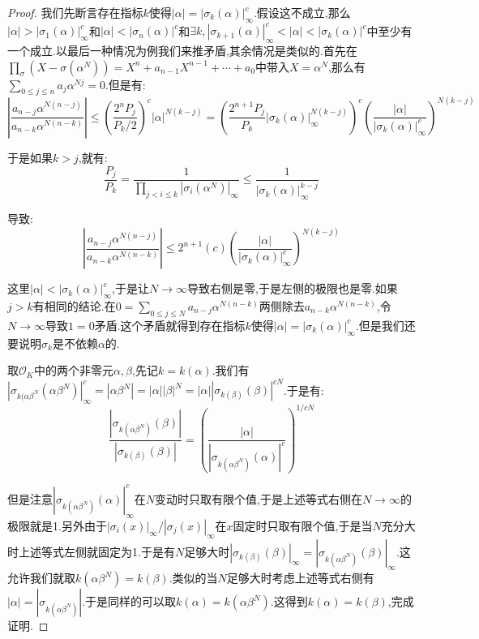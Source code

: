 \begin{enumerate}
\begin{proof}
		\qquad
		
		我们先断言存在指标$k$使得$|\alpha|=|\sigma_k(\alpha)|_{\infty}^c$.假设这不成立,那么$|\alpha|>|\sigma_1(\alpha)|_{\infty}^c$和$|\alpha|<|\sigma_n(\alpha)|^c$和$\exists k,|\sigma_{k+1}(\alpha)|_{\infty}^c<|\alpha|<|\sigma_k(\alpha)|^c$中至少有一个成立.以最后一种情况为例我们来推矛盾,其余情况是类似的.首先在$\prod_{\sigma}(X-\sigma(\alpha^N))=X^n+a_{n-1}X^{n-1}+\cdots+a_0$中带入$X=\alpha^N$,那么有$\sum_{0\le j\le n}a_j\alpha^{Nj}=0$.但是有:
		$$\left|\frac{a_{n-j}\alpha^{N(n-j)}}{a_{n-k}\alpha^{N(n-k)}}\right|\le\left(\frac{2^nP_j}{P_k/2}\right)^c|\alpha|^{N(k-j)}=\left(\frac{2^{n+1}P_j}{P_k}|\sigma_k(\alpha)|_{\infty}^{N(k-j)}\right)^c\left(\frac{|\alpha|}{|\sigma_k(\alpha)|^c_{\infty}}\right)^{N(k-j)}$$
		
		于是如果$k>j$,就有:
		$$\frac{P_j}{P_k}=\frac{1}{\prod_{j<i\le k}|\sigma_i(\alpha^N)|_{\infty}}\le\frac{1}{|\sigma_k(\alpha)|_{\infty}^{k-j}}$$
		
		导致:
		$$\left|\frac{a_{n-j}\alpha^{N(n-j)}}{a_{n-k}\alpha^{N(n-k)}}\right|\le2^{n+1}(c)\left(\frac{|\alpha|}{|\sigma_k(\alpha)|^c_{\infty}}\right)^{N(k-j)}$$
		
		这里$|\alpha|<|\sigma_k(\alpha)|_{\infty}^c$,于是让$N\to\infty$导致右侧是零,于是左侧的极限也是零.如果$j>k$有相同的结论.在$0=\sum_{0\le j\le N}a_{n-j}\alpha^{N(n-k)}$两侧除去$a_{n-k}\alpha^{N(n-k)}$,令$N\to\infty$导致$1=0$矛盾.这个矛盾就得到存在指标$k$使得$|\alpha|=|\sigma_k(\alpha)|_{\infty}^c$.但是我们还要说明$\sigma_k$是不依赖$\alpha$的.
		
		\qquad
		
		取$\mathscr{O}_K$中的两个非零元$\alpha,\beta$,先记$k=k(\alpha)$.我们有$|\sigma_{k(\alpha\beta^N}(\alpha\beta^N)|^c_{\infty}=|\alpha\beta^N|=|\alpha||\beta|^N=|\alpha||\sigma_{k(\beta)}(\beta)|^{cN}$.于是有:
		$$\frac{|\sigma_{k(\alpha\beta^N)}(\beta)|}{|\sigma_{k(\beta)}(\beta)|}=\left(\frac{|\alpha|}{|\sigma_{k(\alpha\beta^N)}(\alpha)|^c}\right)^{1/cN}$$
		
		但是注意$|\sigma_{k(\alpha\beta^N)}(\alpha)|_{\infty}^c$在$N$变动时只取有限个值,于是上述等式右侧在$N\to\infty$的极限就是1.另外由于$|\sigma_i(x)|_{\infty}/|\sigma_j(x)|_{\infty}$在$x$固定时只取有限个值,于是当$N$充分大时上述等式左侧就固定为1.于是有$N$足够大时$|\sigma_{k(\beta)}(\beta)|_{\infty}=|\sigma_{k(\alpha\beta^N)}(\beta)|_{\infty}$.这允许我们就取$k(\alpha\beta^N)=k(\beta)$.类似的当$N$足够大时考虑上述等式右侧有$|\alpha|=|\sigma_{k(\alpha\beta^N)}|$.于是同样的可以取$k(\alpha)=k(\alpha\beta^N)$.这得到$k(\alpha)=k(\beta)$,完成证明.
	\end{proof}
	

\end{enumerate}

